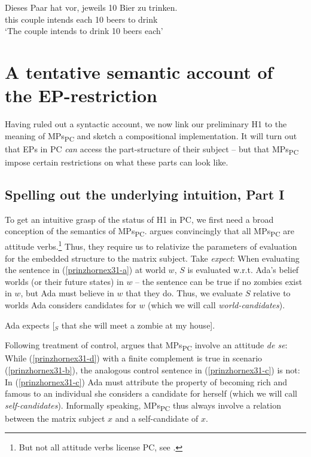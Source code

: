 \documentclass[output=paper,colorlinks,citecolor=brown,
]{langscibook}
\begin{document}
\ea \label{prinzhornex20}
\gll Dieses Paar {hat vor}, jeweils 10 Bier zu trinken.\\
this couple intends  each 10 beers to drink\\
\glt `The couple intends to drink 10 beers each' 
\z



\section{A tentative semantic account of the EP-restriction}\label{prinzhornsec:4}

Having ruled out a syntactic account, we now link our preliminary H1 to the meaning of MPs\textsubscript{PC} and sketch a compositional implementation. It will turn out that EPs in PC \textit{can} access the part-structure of their subject -- but that MPs\textsubscript{PC} impose certain restrictions on what these parts can look like.



\subsection{Spelling out the underlying intuition, Part I}\label{prinzhornsec:4.1}

To get an intuitive grasp of the status of H1 in PC, we first need a broad conception of the semantics of MPs\textsubscript{PC}. \citet{Pearson:2016} argues convincingly that all MPs\textsubscript{PC} are attitude verbs.\footnote{But not all attitude verbs license PC, see .} Thus, they require us to relativize the parameters of evaluation for the embedded structure to the matrix subject. Take \textit{expect}: When evaluating the sentence in (\ref{prinzhornex31-a}) at world $w$, $S$ is evaluated w.r.t. Ada's belief worlds (or their future states) in $w$ -- the sentence can be true if no zombies exist in $w$, but Ada must believe in $w$ that they do. Thus, we evaluate $S$ relative to worlds  Ada considers candidates for $w$ (which we will call \emph{world-candidates}).

\ea\label{prinzhornex31-a} Ada expects [$_{S}$ that she will meet a zombie at my house]. \z

Following   treatment of control, \citet{Pearson:2016} argues that MPs\textsubscript{PC} involve an attitude \textit{de se}: While (\ref{prinzhornex31-d}) with a finite complement is true in scenario (\ref{prinzhornex31-b}), the analogous control sentence  in (\ref{prinzhornex31-c}) is not: In (\ref{prinzhornex31-c}) Ada must attribute the property of becoming rich and famous to an individual she considers a candidate for herself (which we will call \emph{self-candidates}). Informally speaking, MPs\textsubscript{PC} thus always involve a relation between the matrix subject $x$ and a self-candidate of $x$.
\end{document}
